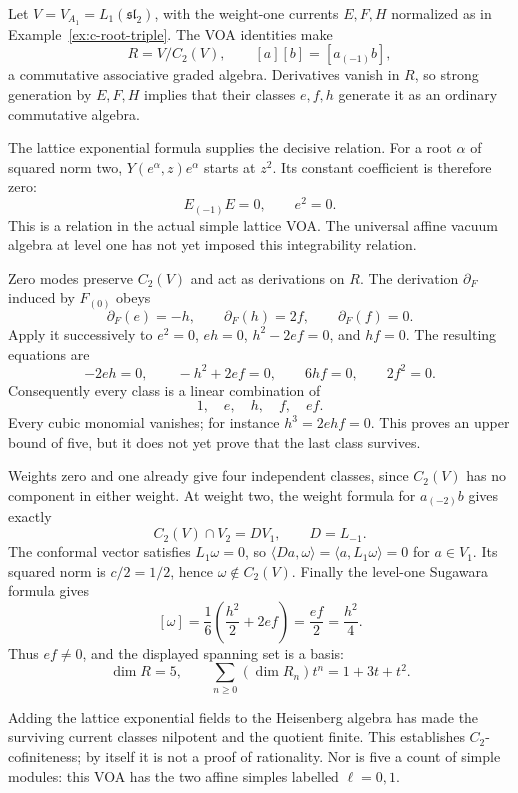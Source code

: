 \begin{example}
\label{ex:regularity-A1-C2}
Let $V=V_{A_1}=L_1(\mathfrak{sl}_2)$, with the weight-one
currents $E,F,H$ normalized as in
Example~\ref{ex:c-root-triple}.
The VOA identities make
\[
 R=V/C_2(V),\qquad [a][b]=[a_{(-1)}b],
\]
a commutative associative graded algebra. Derivatives vanish in
$R$, so strong generation by $E,F,H$ implies that their classes
$e,f,h$ generate it as an ordinary commutative algebra.

The lattice exponential formula supplies the decisive relation.
For a root $\alpha$ of squared norm two, $Y(e^\alpha,z)e^\alpha$
starts at $z^2$. Its constant coefficient is therefore zero:
\[
 E_{(-1)}E=0,\qquad e^2=0.
\]
This is a relation in the actual simple lattice VOA. The universal
affine vacuum algebra at level one has not yet imposed this
integrability relation.

Zero modes preserve $C_2(V)$ and act as derivations on $R$.
The derivation $\partial_F$ induced by $F_{(0)}$ obeys
\[
 \partial_F(e)=-h,\qquad
 \partial_F(h)=2f,\qquad \partial_F(f)=0.
\]
Apply it successively to $e^2=0$, $eh=0$, $h^2-2ef=0$,
and $hf=0$. The resulting equations are
\[
 -2eh=0,\qquad -h^2+2ef=0,\qquad
 6hf=0,\qquad 2f^2=0.
\]
Consequently every class is a linear combination of
\[
 1,\quad e,\quad h,\quad f,\quad ef.
\]
Every cubic monomial vanishes; for instance
$h^3=2ehf=0$. This proves an upper bound of five, but it does
not yet prove that the last class survives.

Weights zero and one already give four independent classes,
since $C_2(V)$ has no component in either weight. At weight two,
the weight formula for $a_{(-2)}b$ gives exactly
\[
 C_2(V)\cap V_2=D V_1,\qquad D=L_{-1}.
\]
The conformal vector satisfies $L_1\omega=0$, so
$\langle Da,\omega\rangle=\langle a,L_1\omega\rangle=0$
for $a\in V_1$. Its squared norm is $c/2=1/2$, hence
$\omega\notin C_2(V)$. Finally the level-one Sugawara formula
gives
\[
 [\omega]=\frac16\left(\frac{h^2}{2}+2ef\right)
          =\frac{ef}{2}=\frac{h^2}{4}.
\]
Thus $ef\ne0$, and the displayed spanning set is a basis:
\[
 \dim R=5,\qquad
 \sum_{n\geq0}(\dim R_n)t^n=1+3t+t^2.
\]

Adding the lattice exponential fields to the Heisenberg algebra
has made the surviving current classes nilpotent and the quotient
finite. This establishes $C_2$-cofiniteness; by itself it is not
a proof of rationality. Nor is five a count of simple modules:
this VOA has the two affine simples labelled $\ell=0,1$.
\end{example}

